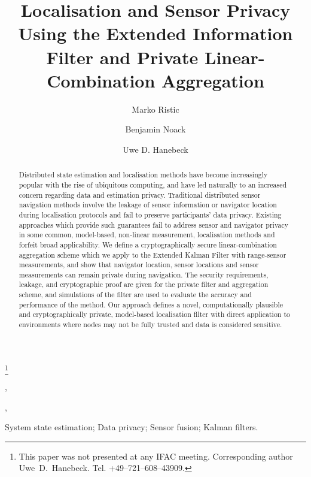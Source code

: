 \documentclass[twocolumn]{autart}
\begin{document}
\begin{frontmatter}

\title{Localisation and Sensor Privacy Using the Extended Information Filter and Private Linear-Combination Aggregation}

\thanks[footnoteinfo]{This paper was not presented at any IFAC 
meeting. Corresponding author Uwe~D.~Hanebeck. Tel. +49--721--608--43909.}

\author[ISAS]{Marko Ristic},
\author[ISAS]{Benjamin Noack},
\author[ISAS]{Uwe D. Hanebeck}

\address[ISAS]{Intelligent Sensor-Actuator-Systems Laboratory, Institute for Anthropomatics, Karlsruhe Institute of Technology, 76131 Karlsruhe, Germany}

\begin{keyword}
System state estimation; Data privacy; Sensor fusion; Kalman filters.
\end{keyword}

\begin{abstract}
Distributed state estimation and localisation methods have become increasingly popular with the rise of ubiquitous computing, and have led naturally to an increased concern regarding data and estimation privacy. Traditional distributed sensor navigation methods involve the leakage of sensor information or navigator location during localisation protocols and fail to preserve participants’ data privacy. Existing approaches which provide such guarantees fail to address sensor and navigator privacy in some common, model-based, non-linear measurement, localisation methods and forfeit broad applicability. We define a cryptographically secure linear-combination aggregation scheme which we apply to the Extended Kalman Filter with range-sensor measurements, and show that navigator location, sensor locations and sensor measurements can remain private during navigation. The security requirements, leakage, and cryptographic proof are given for the private filter and aggregation scheme, and simulations of the filter are used to evaluate the accuracy and performance of the method. Our approach defines a novel, computationally plausible and cryptographically private, model-based localisation filter with direct application to environments where nodes may not be fully trusted and data is considered sensitive.
\end{abstract}

\end{frontmatter}
\end{document}
